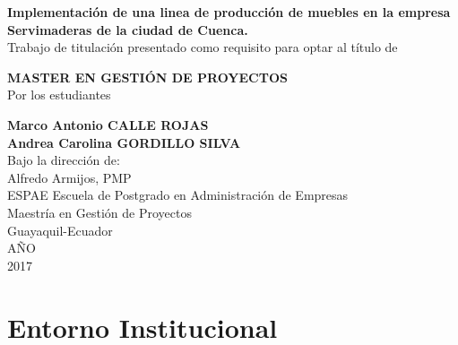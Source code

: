 \documentclass[12pt, a4paper]{article}
\begin{document}
\begin{titlepage}
\begin{center}
\textbf{Implementación de una linea de producción de muebles en la empresa Servimaderas de la ciudad de Cuenca.}\\%
\vspace{0.5cm}
\vspace{3cm}
Trabajo de titulación presentado como requisito para optar al título de \\
\vspace{0.5cm}

\textbf {MASTER EN GESTIÓN DE PROYECTOS}\\

\vspace{2cm}
Por los estudiantes\\
\vspace{0.5cm}

\textbf {Marco Antonio CALLE ROJAS}\\
\vspace{1cm}
\textbf{Andrea Carolina GORDILLO SILVA}\\
\vspace{3cm}
Bajo la dirección de:\\
\vspace{1cm}
Alfredo Armijos, PMP\\
\vspace{3cm}
ESPAE Escuela de Postgrado en Administración de Empresas\\
Maestría en Gestión de Proyectos\\
Guayaquil-Ecuador\\

AÑO\\

2017
\end{center}
\end{titlepage}

\tableofcontents%
\listoftables%
\listoffigures%

\doublespace %
\setlength{\parskip}{\baselineskip}%


\let\olditemize\itemize
\def\itemize{\olditemize\itemsep=0pt }
\newpage

\section {Entorno Institucional}
\end{document}
